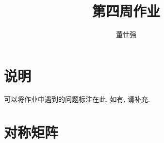 \documentclass[11pt]{ctexart}
\title{第四周作业}
\author{董仕强}
\theoremstyle{definition}
\numberwithin{equation}{section}
\begin{document}
\maketitle

\section{说明}

可以将作业中遇到的问题标注在此. 如有, 请补充.

\tableofcontents

\newpage


\section*{对称矩阵}
\end{document}
